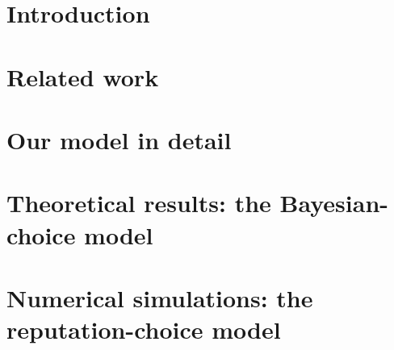 \documentclass[11pt]{article}
\newcommand{\TheoryModel}{Bayesian-choice model\xspace}
\newcommand{\ExptsModel}{reputation-choice model\xspace}
\begin{document}
\section{Introduction}
\label{sec:intro}



\newpage
\section{Related work}
\label{sec:related-work}


\section{Our model in detail}
\label{sec:model}


\newpage
\section{Theoretical results: the \TheoryModel}
\label{sec:theory}

\newpage

%

%

%

%

\section{Numerical simulations: the \ExptsModel}
\label{sec:sim}
\end{document}
